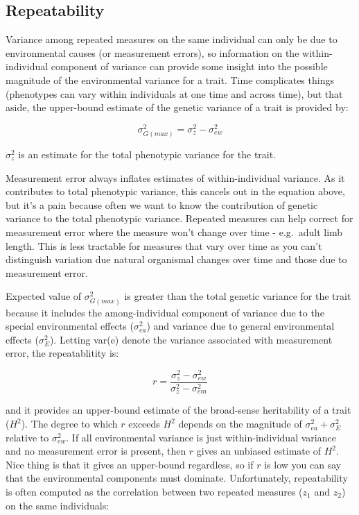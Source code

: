 \documentclass[
]{book}
\begin{document}
\hypertarget{repeatability}{%
\subsection{Repeatability}\label{repeatability}}

Variance among repeated measures on the same individual can only be due to environmental causes (or measurement errors), so information on the within-individual component of variance can provide some insight into the possible magnitude of the environmental variance for a trait. Time complicates things (phenotypes can vary within individuals at one time and across time), but that aside, the upper-bound estimate of the genetic variance of a trait is provided by:

\begin{equation}
  \sigma^2_{G(max)} = \sigma^2_{z} - \sigma^2_{ew}
  \label{eq:genetic-variance-upper-bound}
\end{equation}

\(\sigma^2_{z}\) is an estimate for the total phenotypic variance for the trait.

Measurement error always inflates estimates of within-individual variance. As it contributes to total phenotypic variance, this cancels out in the equation above, but it's a pain because often we want to know the contribution of genetic variance to the total phenotypic variance. Repeated measures can help correct for measurement error where the measure won't change over time - e.g.~adult limb length. This is less tractable for measures that vary over time as you can't distinguish variation due natural organismal changes over time and those due to measurement error.

Expected value of \(\sigma^2_{G(max)}\) is greater than the total genetic variance for the trait because it includes the among-individual component of variance due to the special environmental effects (\(\sigma^2_{ea}\)) and variance due to general environmental effects (\(\sigma^2_{E}\)). Letting var(e) denote the variance associated with measurement error, the repeatablitity is:

\begin{equation}
  r = \frac{\sigma^2_{z} - \sigma^2_{ew}} {\sigma^2_{z} - \sigma^2_{em}}
  \label{eq:repeatability}
\end{equation}

and it provides an upper-bound estimate of the broad-sense heritability of a trait (\(H^2\)). The degree to which \(r\) exceeds \(H^2\) depends on the magnitude of \(\sigma^2_{ea} + \sigma^2_{E}\) relative to \(\sigma^2_{ew}\). If all environmental variance is just within-individual variance and no measurement error is present, then \(r\) gives an unbiased estimate of \(H^2\). Nice thing is that it gives an upper-bound regardless, so if \(r\) is low you can say that the environmental components must dominate. Unfortunately, repeatability is often computed as the correlation between two repeated measures (\(z_1\) and \(z_2\)) on the same individuals:
\end{document}
